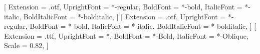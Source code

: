 %

\usepackage{fontspec}
\usepackage{unicode-math}
\setmainfont{texgyrepagella}[
  Extension      = .otf,
  UprightFont    = *-regular,
  BoldFont       = *-bold,
  ItalicFont     = *-italic,
  BoldItalicFont = *-bolditalic,
]
\setsansfont{texgyreheros}[
  Extension      = .otf,
  UprightFont    = *-regular,
  BoldFont       = *-bold,
  ItalicFont     = *-italic,
  BoldItalicFont = *-bolditalic,
]
\setmonofont{DejaVuSansMono}[
  Extension      = .ttf,
  UprightFont    = *,
  BoldFont       = *-Bold,
  ItalicFont     = *-Oblique,
  Scale          = 0.82,
]

\newfontfamily{}
\newcommand{\ltpcjktext}[1]{{\ltpcjk #1}}

\usepackage[a4paper,margin=1in]{geometry}
\usepackage{microtype}
\setlength{\emergencystretch}{3em}   %

